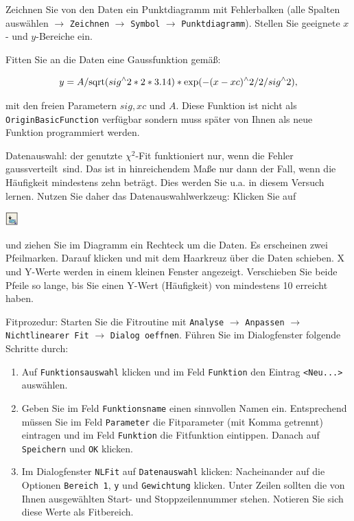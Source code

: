 \documentclass[
    landscape,
    twocolumn
]{article}
\begin{document}
\begin{itemize}
Zeichnen Sie von den Daten ein Punktdiagramm mit Fehlerbalken (alle Spalten ausw\"{a}hlen  $\rightarrow$ \verb"Zeichnen" $\rightarrow$ \verb"Symbol" $\rightarrow$ \verb"Punktdiagramm"). Stellen Sie geeignete $x$- und $y$-Bereiche ein.

Fitten Sie an die Daten eine Gaussfunktion gem\"{a}{\ss}:

\begin{equation}\notag
    y= A/\text{sqrt}(sig^\wedge 2*2*3.14)*\text{exp}(-(x-xc)^\wedge 2/2/sig^\wedge2),
\end{equation}

mit den freien Parametern $sig, xc$ und $A$. Diese Funktion ist nicht als \verb"OriginBasicFunction" verf\"{u}gbar sondern muss sp\"{a}ter von Ihnen als neue Funktion programmiert werden.


Datenauswahl: der genutzte $\chi^2$-Fit funktioniert nur, wenn die Fehler \glqq gaussverteilt\grqq~sind. Das ist in hinreichendem Ma{\ss}e nur dann der Fall, wenn die H\"{a}ufigkeit mindestens zehn betr\"{a}gt. Dies werden Sie u.a. in diesem Versuch lernen. Nutzen Sie daher das Datenauswahlwerkzeug: Klicken Sie auf  \begin{minipage}{5mm}
\includegraphics[height=5mm]{icon_auswahl.eps}\end{minipage} und ziehen Sie im Diagramm ein Rechteck um die Daten. Es erscheinen zwei Pfeilmarken. Darauf klicken und mit dem Haarkreuz \"{u}ber die Daten schieben. X und Y-Werte werden in einem kleinen Fenster angezeigt. Verschieben Sie beide Pfeile so lange, bis Sie einen Y-Wert (H\"{a}ufigkeit) von mindestens 10 erreicht haben.



Fitprozedur: Starten Sie die Fitroutine mit \verb"Analyse"  $\rightarrow$ \verb"Anpassen" $\rightarrow$ \verb"Nichtlinearer Fit" $\rightarrow$ \verb"Dialog oeffnen". F\"{u}hren Sie im Dialogfenster folgende Schritte durch:
\begin{enumerate}
  \item Auf \verb"Funktionsauswahl" klicken und im Feld \verb"Funktion" den Eintrag \verb"<Neu...>" ausw\"{a}hlen.
  \item Geben Sie im Feld \verb"Funktionsname" einen sinnvollen Namen ein. Entsprechend m\"{u}ssen Sie im Feld \verb"Parameter" die Fitparameter (mit Komma getrennt) eintragen und im Feld \verb"Funktion" die Fitfunktion eintippen. Danach auf \verb"Speichern" und \verb"OK"  klicken.
  \item  Im Dialogfenster \verb"NLFit"  auf \verb"Datenauswahl" klicken: Nacheinander auf die Optionen
\verb"Bereich 1", \verb"y" und \verb"Gewichtung" klicken. Unter Zeilen sollten die von Ihnen ausgew\"{a}hlten Start- und Stoppzeilennummer stehen.  Notieren Sie sich diese Werte als \glqq Fitbereich\grqq.


\end{enumerate}
\end{itemize}
\end{document}
